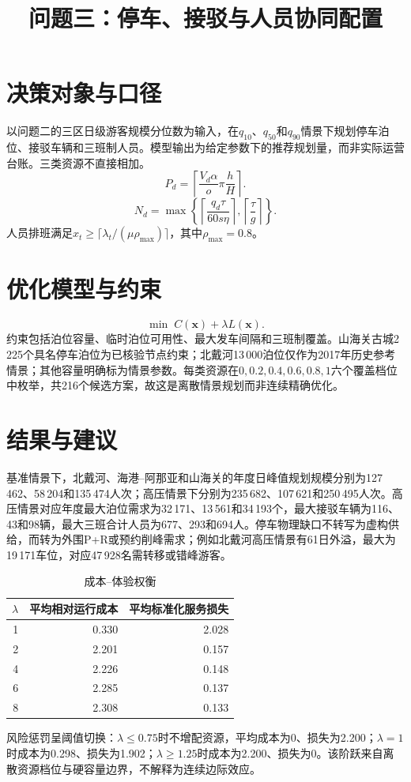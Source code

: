 \documentclass[UTF8,12pt,a4paper]{ctexart}
\title{问题三：停车、接驳与人员协同配置}\author{}\date{}
\begin{document}
\maketitle
\section{决策对象与口径}
以问题二的三区日级游客规模分位数为输入，在$q_{10}$、$q_{50}$和$q_{90}$情景下规划停车泊位、接驳车辆和三班制人员。模型输出为给定参数下的推荐规划量，而非实际运营台账。三类资源不直接相加。
\begin{equation}P_d=\left\lceil\frac{V_d\alpha}{o}\pi\frac{h}{H}\right\rceil.\end{equation}
\begin{equation}N_d=\max\left\{\left\lceil\frac{q_d\tau}{60s\eta}\right\rceil,\left\lceil\frac{\tau}{g}\right\rceil\right\}.\end{equation}
人员排班满足$x_t\geq\lceil\lambda_t/(\mu\rho_{\max})\rceil$，其中$\rho_{\max}=0.8$。
\section{优化模型与约束}
\begin{equation}\min\;C(\mathbf x)+\lambda L(\mathbf x).\end{equation}
约束包括泊位容量、临时泊位可用性、最大发车间隔和三班制覆盖。山海关古城2\,225个具名停车泊位为已核验节点约束；北戴河13\,000泊位仅作为2017年历史参考情景；其他容量明确标为情景参数。每类资源在\(0,0.2,0.4,0.6,0.8,1\)六个覆盖档位中枚举，共216个候选方案，故这是离散情景规划而非连续精确优化。
\section{结果与建议}
基准情景下，北戴河、海港--阿那亚和山海关的年度日峰值规划规模分别为127\,462、58\,204和135\,474人次；高压情景下分别为235\,682、107\,621和250\,495人次。高压情景对应年度最大泊位需求为32\,171、13\,561和34\,193个，最大接驳车辆为116、43和98辆，最大三班合计人员为677、293和694人。停车物理缺口不转写为虚构供给，而转为外围P+R或预约削峰需求；例如北戴河高压情景有61日外溢，最大为19\,171车位，对应47\,928名需转移或错峰游客。
\begin{table}[H]\centering\caption{成本--体验权衡}\begin{tabular}{rrr}\toprule
$\lambda$&平均相对运行成本&平均标准化服务损失\\\midrule
1&0.330&2.028\\2&2.201&0.157\\4&2.226&0.148\\6&2.285&0.137\\8&2.308&0.133\\\bottomrule
\end{tabular}\end{table}
风险惩罚呈阈值切换：$\lambda\le0.75$时不增配资源，平均成本为0、损失为2.200；$\lambda=1$时成本为0.298、损失为1.902；$\lambda\ge1.25$时成本为2.200、损失为0。该阶跃来自离散资源档位与硬容量边界，不解释为连续边际效应。
\end{document}
